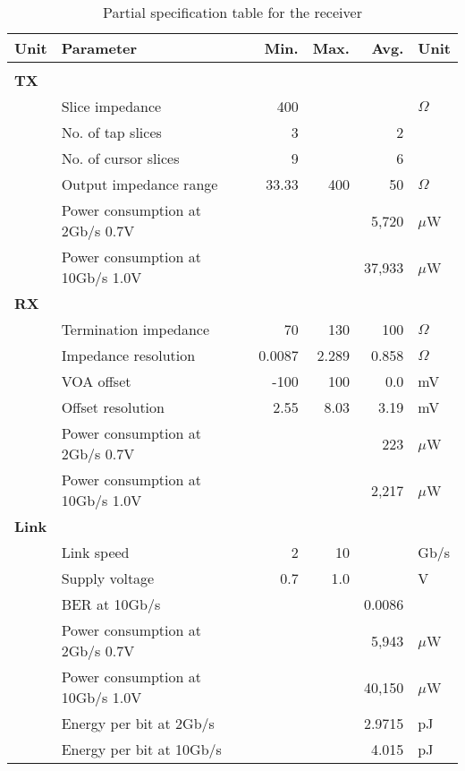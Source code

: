 \begin{table}[H]
  \centering
  \begin{tabular}{l l|r|r|r|l}
 Unit  & Parameter & Min. & Max. & Avg. & Unit \\
    \hline
    & & & & &\\
\textbf{TX} & & & & &\\
&	Slice impedance & 400 &  &  & $\Omega$\\
&	No. of tap slices & 3 &  & 2 & \\
&	No. of cursor slices & 9 &  & 6 & \\
&	Output impedance range & 33.33 & 400 & 50 & $\Omega$\\
&	Power consumption at 2Gb/s 0.7V &  &  & 5,720 & $\mu$W\\
&	Power consumption at 10Gb/s 1.0V &  &  & 37,933 & $\mu$W\\

\textbf{RX} & & & & &\\
&	Termination impedance & 70 & 130 & 100 & $\Omega$\\
&	Impedance resolution & 0.0087 & 2.289 & 0.858 & $\Omega$\\
&	VOA offset & -100 & 100 & 0.0 & mV\\
&	Offset resolution & 2.55 & 8.03 & 3.19 & mV\\
&	Power consumption at 2Gb/s 0.7V &  &  & 223  & $\mu$W\\
&	Power consumption at 10Gb/s 1.0V &&  &  2,217  & $\mu$W\\

\textbf{Link} & & & & &\\
&	Link speed & 2 & 10 &  & Gb/s \\
&	Supply voltage  & 0.7 & 1.0 &  & V\\
&	BER at 10Gb/s  &  &  & 0.0086 & \\
&	Power consumption at 2Gb/s 0.7V &  &  & 5,943 & $\mu$W\\
&	Power consumption at 10Gb/s 1.0V &  &  & 40,150 & $\mu$W\\
&   Energy per bit at 2Gb/s &  & & 2.9715 & pJ \\
&   Energy per bit at 10Gb/s &  & & 4.015 & pJ \\
  \end{tabular}
  \caption{Partial specification table for the receiver}
  \label{tab:specifications}
\end{table}